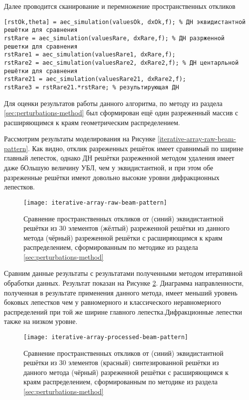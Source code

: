 Далее проводится сканирование и перемножение пространственных откликов

\begin{verbatim}
[rstOk,theta] = aec_simulation(valuesOk, dxOk,f); % ДН эквидистантной решётки для сравнения
rstRare = aec_simulation(valuesRare, dxRare,f); % ДН разрженной решетки для сравнения
rstRare1 = aec_simulation(valuesRare1, dxRare,f);
rstRare2 = aec_simulation(valuesRare2, dxRare2,f); % ДН центарльной решётки для сравнения
rstRare21 = aec_simulation(valuesRare21, dxRare2,f);
rstRare3 = rstRare21.*rstRare; % результирующая ДН
\end{verbatim}

Для оценки результатов работы данного алгоритма, по методу из раздела \ref{sec:perturbations-method} был сформирован 
ещё один разреженный массив с расширяющимся к краям геометрическим распределением.

Рассмотрим результаты моделирования на Рисунке \ref{iterative-array-raw-beam-pattern}. Как видно, отклик разреженных 
решёток имеет сравнимый по ширине главный лепесток, однако ДН решётки разреженной методом 
удаления имеет даже бОльшую величину УБЛ, чем у эквидистантной, 
и при этом обе разреженные решётки имеют довольно высокие уровни дифракционных лепестков.

\begin{figure}[!ht]
    \centering
    \texttt{[image: iterative-array-raw-beam-pattern]}
    \caption{Сравнение пространственных откликов от 
    (синий) эквидистантной решётки из 30 элементов
    (жёлтый) разреженной решётки из данного метода
    (чёрный) разреженной решётки с расширяющимся к краям распределением, сформированным по методике из раздела \ref{sec:perturbations-method}
    }%
    \label{fig:iterative-array-raw-beam-pattern}
\end{figure}

Сравним данные результаты с результатами полученными методом итеративной обработки данных. Результат показан на Рисунке \ref{fig:iterative-array-processed-beam-pattern}. 
Диаграмма направленности, полученная в результате применения данного метода, имеет меньший уровень боковых лепестков чем у равномерного и классического неравномерного распределений при той же ширине главного лепестка.Дифракционные лепестки также на низком уровне. 

\begin{figure}[H]
    \centering
    \texttt{[image: iterative-array-processed-beam-pattern]}
    \caption{Сравнение пространственных откликов от 
    (синий) эквидистантной решётки из 30 элементов
    (красный) синтезированной решётки из данного метода
    (чёрный) разреженной решётки с расширяющимся к краям распределением, сформированным по методике из раздела \ref{sec:perturbations-method}
    }%
    \label{fig:iterative-array-processed-beam-pattern}
\end{figure}

